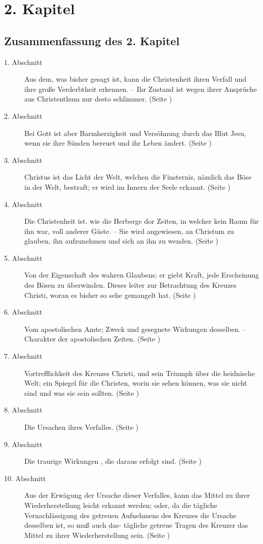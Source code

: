 
\chapter{2. Kapitel}  \label{kap2}


\section{Zusammenfassung des 2. Kapitel}
\footnotesize
\begin{description}
\item[1. Abschnitt] Aus dem, was bisher gesagt ist, kann die Christenheit ihren
Verfall und ihre große Verderbtheit erkennen. -- Ihr Zustand ist wegen ihrer
Ansprüche aus Christenthum nur desto schlimmer. (Seite \pageref{kap2_ab1})
\item[2. Abschnitt] Bei Gott ist aber Barmherzigkeit und Versöhnung durch das
Blut Jesu, wenn sie ihre Sünden bereuet und ihr Leben ändert. (Seite
\pageref{kap2_ab2})
\item[3. Abschnitt] Christus ist das Licht der Welt, welchen die Finsternis,
nämlich das Böse in der Welt, bestraft; er wird im Innern der Seele erkannt.
(Seite \pageref{kap2_ab3})
\item[4. Abschnitt] Die Christenheit ist. wie die Herberge dor Zeiten, in
welcher kein Raum für ihn war, voll anderer Gäste. -- Sie wird angewiesen, an
Christum zu glauben, ihn aufzunehmen und sich an ihn zu wenden. (Seite
\pageref{kap2_ab4})
\item[5. Abschnitt] Von der Eigenschaft des wahren Glaubens; er giebt Kraft,
jede Erscheinung des Bösen zu überwinden. Dieses leiter zur Betrachtung des
Kreuzes Christi, woran es bisher so sehe gemangelt hat. (Seite
\pageref{kap2_ab5})
\item[6. Abschnitt] Vom apostolischen Amte; Zweck und gesegnete Wirkungen
desselben. -- Charakter der apostolischen Zeiten. (Seite \pageref{kap2_ab6})
\item[7. Abschnitt] Vortrefflichkeit des Kreuzes Christi, und sein Triumph über
die heidnische Welt; ein Spiegel für die Christen, worin sie sehen können, was
sie nicht sind und was sie sein sollten. (Seite \pageref{kap2_ab7})
\item[8. Abschnitt] Die Ursachen ihres Verfalles. (Seite \pageref{kap2_ab8})
\item[9. Abschnitt] Die traurige Wirkungen , die daraus erfolgt sind. (Seite
\pageref{kap2_ab9})
\item[10. Abschnitt] Aus der Erwägung der Ursache dieser Verfalles, kann das
Mittel zu ihrer Wiederherstellung leicht erkannt werden; oder, da die tägliche
Vernachlässigung des getreuen Aufnehmens des Kreuzes die Ursache desselben ist,
so muß auch das- tägliche getreue Tragen des Kreuzer das Mittel zu ihrer
Wiederherstellung sein. (Seite \pageref{kap2_ab10})
\end{description}
\normalsize

